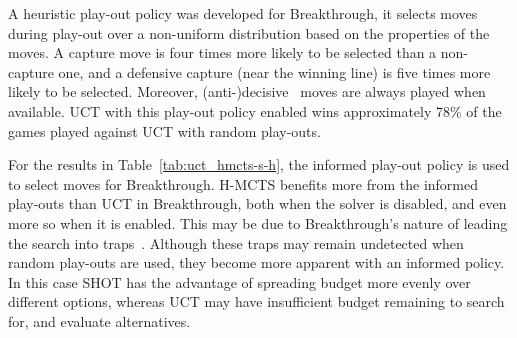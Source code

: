 \documentclass{icga}
\begin{document}
A heuristic play-out policy was developed for Breakthrough, it selects moves during play-out over a non-uniform distribution based on the properties of the moves. A capture move is four times more likely to be selected than a non-capture one, and a defensive capture (near the winning line) is five times more likely to be selected. Moreover, (anti-)decisive~ moves are always played when available. UCT with this play-out policy enabled wins approximately 78\% of the games played against UCT with random play-outs. 

For the results in Table~\ref{tab:uct_hmcts-s-h}, the informed play-out policy is used to select moves for Breakthrough. H-MCTS benefits more from the informed play-outs than UCT in Breakthrough, both when the solver is disabled, and even more so when it is enabled. This may be due to Breakthrough's nature of leading the search into traps~. Although these traps may remain undetected when random play-outs are used, they become more apparent with an informed policy. In this case SHOT has the advantage of spreading budget more evenly over different options, whereas UCT may have insufficient budget remaining to search for, and evaluate alternatives.


\end{document}
